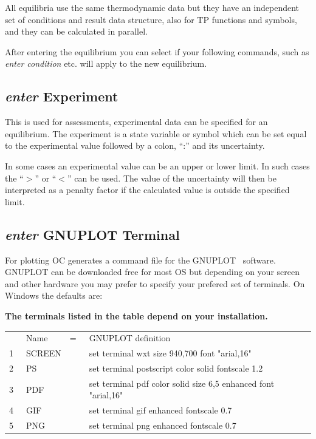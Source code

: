 \documentclass[11pt]{article}
\begin{document}
All equilibria use the same thermodynamic data but they have an
independent set of conditions and result data structure, also for TP
functions and symbols, and they can be calculated in parallel.

After entering the equilibrium you can select if your following
commands, such as {\em enter condition} etc. will apply to the new
equilibrium.

\hypertarget{Enter experiment}{}
\subsection{{\em enter} Experiment}\label{sc:enterexp}

This is used for assessments, experimental data can be specified for
an equilibrium.  The experiment is a state variable or symbol which
can be set equal to the experimental value followed by a colon, ``:''
and its uncertainty.

In some cases an experimental value can be an upper or lower limit.
In such cases the ``$>$'' or ``$<$'' can be used.  The value of the
uncertainty will then be interpreted as a penalty factor if the
calculated value is outside the specified limit.

\hypertarget{Enter GNUTERM}{}
\subsection{{\em enter} GNUPLOT Terminal}\label{sc:gnuterm}

For plotting OC generates a command file for the
GNUPLOT~\cite{gnuplot} software.  GNUPLOT can be downloaded free for
most OS but depending on your screen and other hardware you may prefer
to specify your prefered set of terminals.  On Windows the defaults
are:

{\bf The terminals listed in the table depend on your installation.}

\begin{tabular}{rlcl}
  & Name   &=~& GNUPLOT definition\\
 1~& SCREEN & & set terminal wxt size 940,700 font "arial,16"\\
 2~& PS     & & set terminal postscript color solid fontscale 1.2\\
 3~& PDF    & & set terminal pdf color solid size 6,5 enhanced font "arial,16"\\
 4~& GIF    & & set terminal gif enhanced fontscale 0.7\\
 5~& PNG    & & set terminal png enhanced fontscale 0.7\\
\end{tabular}
\end{document}
